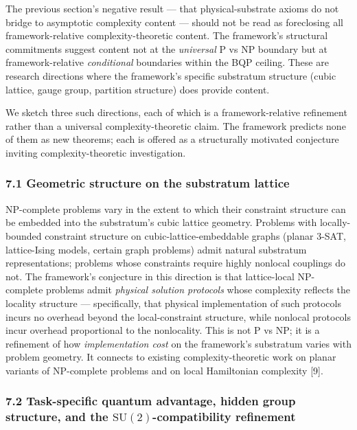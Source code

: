 \documentclass[
]{article}
\begin{document}
The previous section's negative result --- that physical-substrate
axioms do not bridge to asymptotic complexity content --- should not be
read as foreclosing all framework-relative complexity-theoretic content.
The framework's structural commitments suggest content not at the
\emph{universal} P vs NP boundary but at framework-relative
\emph{conditional} boundaries within the BQP ceiling. These are research
directions where the framework's specific substratum structure (cubic
lattice, gauge group, partition structure) does provide content.

We sketch three such directions, each of which is a framework-relative
refinement rather than a universal complexity-theoretic claim. The
framework predicts none of them as new theorems; each is offered as a
structurally motivated conjecture inviting complexity-theoretic
investigation.

\hypertarget{geometric-structure-on-the-substratum-lattice}{%
\subsubsection{7.1 Geometric structure on the substratum
lattice}\label{geometric-structure-on-the-substratum-lattice}}

NP-complete problems vary in the extent to which their constraint
structure can be embedded into the substratum's cubic lattice geometry.
Problems with locally-bounded constraint structure on
cubic-lattice-embeddable graphs (planar 3-SAT, lattice-Ising models,
certain graph problems) admit natural substratum representations;
problems whose constraints require highly nonlocal couplings do not. The
framework's conjecture in this direction is that lattice-local
NP-complete problems admit \emph{physical solution protocols} whose
complexity reflects the locality structure --- specifically, that
physical implementation of such protocols incurs no overhead beyond the
local-constraint structure, while nonlocal protocols incur overhead
proportional to the nonlocality. This is not P vs NP; it is a refinement
of how \emph{implementation cost} on the framework's substratum varies
with problem geometry. It connects to existing complexity-theoretic work
on planar variants of NP-complete problems and on local Hamiltonian
complexity {[}9{]}.

\hypertarget{task-specific-quantum-advantage-hidden-group-structure-and-the-mathrmsu2-compatibility-refinement}{%
\subsubsection{\texorpdfstring{7.2 Task-specific quantum advantage,
hidden group structure, and the \(\mathrm{SU}(2)\)-compatibility
refinement}{7.2 Task-specific quantum advantage, hidden group structure, and the \textbackslash mathrm\{SU\}(2)-compatibility refinement}}\label{task-specific-quantum-advantage-hidden-group-structure-and-the-mathrmsu2-compatibility-refinement}}
\end{document}
